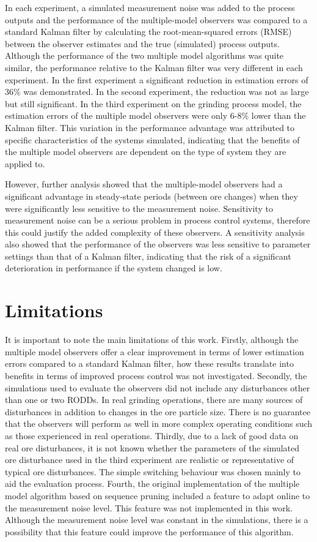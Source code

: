 In each experiment, a simulated measurement noise was added to the process outputs and the performance of the multiple-model observers was compared to a standard Kalman filter by calculating the root-mean-squared errors (\gls{RMSE}) between the observer estimates and the true (simulated) process outputs. Although the performance of the two multiple model algorithms was quite similar, the performance relative to the Kalman filter was very different in each experiment. In the first experiment a significant reduction in estimation errors of 36\% was demonstrated. In the second experiment, the reduction was not as large but still significant. In the third experiment on the grinding process model, the estimation errors of the multiple model observers were only 6-8\% lower than the Kalman filter. This variation in the performance advantage was attributed to specific characteristics of the systems simulated, indicating that the benefits of the multiple model observers are dependent on the type of system they are applied to.

However, further analysis showed that the multiple-model observers had a significant advantage in steady-state periods (between ore changes) when they were significantly less sensitive to the measurement noise. Sensitivity to measurement noise can be a serious problem in process control systems, therefore this could justify the added complexity of these observers. A sensitivity analysis also showed that the performance of the observers was less sensitive to parameter settings than that of a Kalman filter, indicating that the risk of a significant deterioration in performance if the system changed is low.


\section{Limitations}

It is important to note the main limitations of this work. Firstly, although the multiple model observers offer a clear improvement in terms of lower estimation errors compared to a standard Kalman filter, how these results translate into benefits in terms of improved process control was not investigated. Secondly, the simulations used to evaluate the observers did not include any disturbances other than one or two RODDs. In real grinding operations, there are many sources of disturbances in addition to changes in the ore particle size. There is no guarantee that the observers will perform as well in more complex operating conditions such as those experienced in real operations. Thirdly, due to a lack of good data on real ore disturbances, it is not known whether the parameters of the simulated ore disturbance used in the third experiment are realistic or representative of typical ore disturbances. The simple switching behaviour was chosen mainly to aid the evaluation process. Fourth, the original implementation of the multiple model algorithm based on sequence pruning \citep{eriksson_classification_1996} included a feature to adapt online to the measurement noise level. This feature was not implemented in this work. Although the measurement noise level was constant in the simulations, there is a possibility that this feature could improve the performance of this algorithm.

